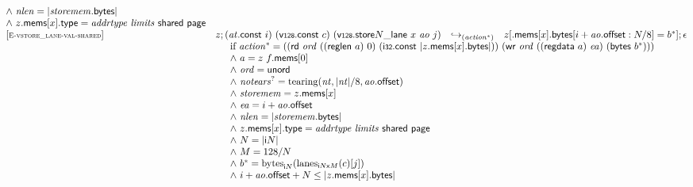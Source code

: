 $$\begin{array}[t]{@{}lrcl@{}l@{}}
{\begin{array}[t]{@{}l@{}}
{\land}~ {\mathit{nlen}} = {|{\mathit{storemem}}{.}\mathsf{bytes}|} \\
{\land}~ z{.}\mathsf{mems}{}[x]{.}\mathsf{type} = {\mathit{addrtype}}~{\mathit{limits}}~\mathsf{shared}~\mathsf{page} \\
\end{array}
} \\
{[\textsc{\scriptsize E{-}vstore\_lane{-}val{-}shared}]} \quad & z ; ({\mathit{at}}{.}\mathsf{const}~i)~(\mathsf{v{\scriptstyle 128}}{.}\mathsf{const}~c)~({\mathsf{v{\scriptstyle 128}}{.}\mathsf{store}}{N}{\mathsf{\_}}{\mathsf{lane}}~x~{\mathit{ao}}~j) & {\hookrightarrow}_{({{\mathit{action}}^\ast})} {} & z{}[{.}\mathsf{mems}{}[x]{.}\mathsf{bytes}{}[i + {\mathit{ao}}{.}\mathsf{offset} : N / 8] = {b^\ast}] ; \epsilon &  \\
& \multicolumn{4}{@{}l@{}}{\quad
\quad
\begin{array}[t]{@{}l@{}}
\mbox{if}~ {{\mathit{action}}^\ast} = ((\mathsf{rd}~{\mathit{ord}}~((\mathsf{reglen}~a)~0)~(\mathsf{i{\scriptstyle 32}}{.}\mathsf{const}~{|z{.}\mathsf{mems}{}[x]{.}\mathsf{bytes}|}))~(\mathsf{wr}~{\mathit{ord}}~((\mathsf{regdata}~a)~{\mathit{ea}})~(\mathsf{bytes}~{b^\ast}))) \\
{\land}~ a = z~f{.}\mathsf{mems}{}[0] \\
{\land}~ {\mathit{ord}} = \mathsf{unord} \\
{\land}~ {{\mathit{notears}}^?} = {\mathrm{tearing}}({\mathit{nt}}, {|{\mathit{nt}}|} / 8, {\mathit{ao}}{.}\mathsf{offset}) \\
{\land}~ {\mathit{storemem}} = z{.}\mathsf{mems}{}[x] \\
{\land}~ {\mathit{ea}} = i + {\mathit{ao}}{.}\mathsf{offset} \\
{\land}~ {\mathit{nlen}} = {|{\mathit{storemem}}{.}\mathsf{bytes}|} \\
{\land}~ z{.}\mathsf{mems}{}[x]{.}\mathsf{type} = {\mathit{addrtype}}~{\mathit{limits}}~\mathsf{shared}~\mathsf{page} \\
{\land}~ N = {|{\mathsf{i}}{N}|} \\
{\land}~ M = 128 / N \\
{\land}~ {b^\ast} = {{\mathrm{bytes}}}_{{\mathsf{i}}{N}}({{\mathrm{lanes}}}_{{{\mathsf{i}}{N}}{\mathsf{x}}{M}}(c){}[j]) \\
{\land}~ i + {\mathit{ao}}{.}\mathsf{offset} + N \leq {|z{.}\mathsf{mems}{}[x]{.}\mathsf{bytes}|} \\
\end{array}
} \\
\end{array}
$$

